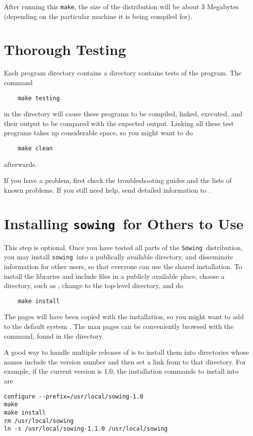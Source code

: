 \documentclass[11pt,twoside]{article}
\newcommand{\sowing}{{\tt sowing}}
\newcommand{\Sowing}{{\tt Sowing}}
\begin{document}
After running this {\tt make}, the size of the distribution will be about 3
Megabytes (depending on the particular machine it is being compiled for). 

\section{Thorough Testing}
\label{sec:thorough}
\label{sec-tests}

Each program directory contains a  directory contains tests of
the program.
The command
\begin{verbatim}
    make testing
\end{verbatim}
in the  directory will cause these programs to be
compiled, linked, executed, and their output to be compared with the expected
output.  Linking all these test programs takes up considerable space, so you
might want to do 
\begin{verbatim}
    make clean
\end{verbatim}
afterwards.  

If you have a problem, first check the troubleshooting guides and the lists of
known problems.  If you still need help, send detailed information to
. 

\section{Installing \sowing\ for Others to Use}
\label{sec:installing}
This step is optional.  
Once you have tested all parts of the \Sowing\ distribution, you may install
\sowing\ into 
a publically available directory, and disseminate information for other users,
so that everyone can use the shared installation.
To install the libraries and include files in a
publicly available place, choose a directory, such as ,
change to the top-level  directory, and do
\begin{verbatim}
    make install
\end{verbatim}
The  pages will have been copied with the installation, so you might
want to add  to the default system .
The man pages can be conveniently browsed with the  command,
found in the  directory.

A good way to handle multiple releases of  is to install
them into directories whose names include the version number and then
set a link from  to that directory.  For example, if the
current version is 1.0, the installation commands to install into
 are 
\begin{verbatim}
configure --prefix=/usr/local/sowing-1.0
make
make install 
rm /usr/local/sowing
ln -s /usr/local/sowing-1.1.0 /usr/local/sowing
\end{verbatim}
\end{document}
